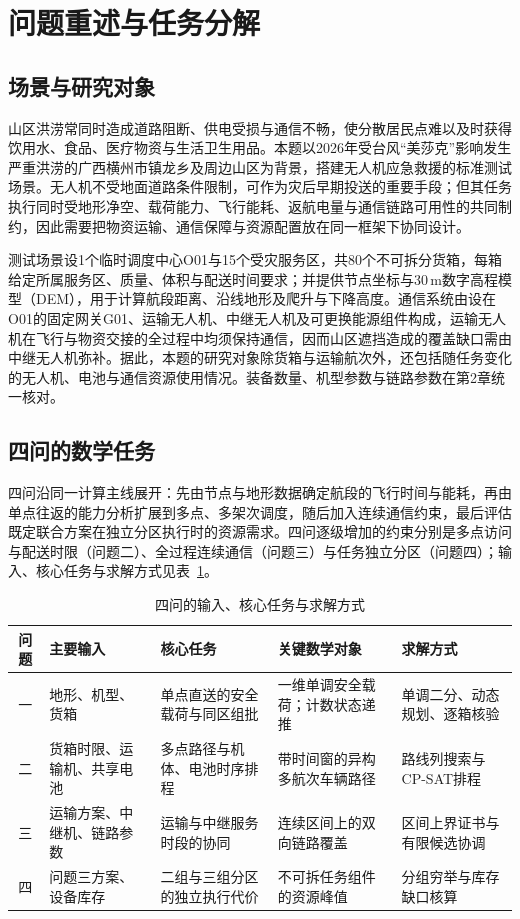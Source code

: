 \section{问题重述与任务分解}

\subsection{场景与研究对象}

山区洪涝常同时造成道路阻断、供电受损与通信不畅，使分散居民点难以及时获得饮用水、食品、医疗物资与生活卫生用品。本题以2026年受台风“美莎克”影响发生严重洪涝的广西横州市镇龙乡及周边山区为背景，搭建无人机应急救援的标准测试场景。无人机不受地面道路条件限制，可作为灾后早期投送的重要手段；但其任务执行同时受地形净空、载荷能力、飞行能耗、返航电量与通信链路可用性的共同制约，因此需要把物资运输、通信保障与资源配置放在同一框架下协同设计。

测试场景设1个临时调度中心O01与15个受灾服务区，共80个不可拆分货箱，每箱给定所属服务区、质量、体积与配送时间要求；并提供节点坐标与30\,m数字高程模型（DEM），用于计算航段距离、沿线地形及爬升与下降高度。通信系统由设在O01的固定网关G01、运输无人机、中继无人机及可更换能源组件构成，运输无人机在飞行与物资交接的全过程中均须保持通信，因而山区遮挡造成的覆盖缺口需由中继无人机弥补。据此，本题的研究对象除货箱与运输航次外，还包括随任务变化的无人机、电池与通信资源使用情况。装备数量、机型参数与链路参数在第2章统一核对。

\subsection{四问的数学任务}

四问沿同一计算主线展开：先由节点与地形数据确定航段的飞行时间与能耗，再由单点往返的能力分析扩展到多点、多架次调度，随后加入连续通信约束，最后评估既定联合方案在独立分区执行时的资源需求。四问逐级增加的约束分别是多点访问与配送时限（问题二）、全过程连续通信（问题三）与任务独立分区（问题四）；输入、核心任务与求解方式见表~\ref{tab:task_map}。

\begin{table}[H]\centering\normalsize
\caption{四问的输入、核心任务与求解方式}\label{tab:task_map}
\begin{tabular}{cp{2.5cm}p{3.2cm}p{3.5cm}p{3.5cm}}\toprule
问题 & 主要输入 & 核心任务 & 关键数学对象 & 求解方式\\\midrule
一 & 地形、机型、货箱 & 单点直送的安全载荷与同区组批 & 一维单调安全载荷；计数状态递推 & 单调二分、动态规划、逐箱核验\\
二 & 货箱时限、运输机、共享电池 & 多点路径与机体、电池时序排程 & 带时间窗的异构多航次车辆路径 & 路线列搜索与CP-SAT排程\\
三 & 运输方案、中继机、链路参数 & 运输与中继服务时段的协同 & 连续区间上的双向链路覆盖 & 区间上界证书与有限候选协调\\
四 & 问题三方案、设备库存 & 二组与三组分区的独立执行代价 & 不可拆任务组件的资源峰值 & 分组穷举与库存缺口核算\\\bottomrule
\end{tabular}\end{table}

